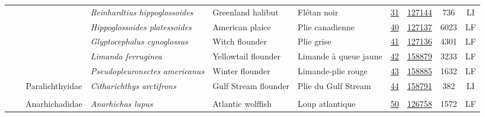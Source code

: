 \documentclass[12pt]{article}\usepackage[]{graphicx}\usepackage[]{color}
\begin{document}
\begin{landscape}
\begin{longtable}[t]{ccc>{\centering\arraybackslash}p{3cm}>{\centering\arraybackslash}p{3cm}>{\centering\arraybackslash}p{3cm}>{}c>{}ccc}
\nopagebreak
\hspace{1em}\hspace{1em} &  &  & \em{Reinhardtius hippoglossoides} & Greenland halibut & Flétan noir & \href{#sec:31}{31} & \href{http://www.marinespecies.org/aphia.php?p=taxdetails&id=127144}{127144} & 736 & LI\\
\nopagebreak
\hspace{1em}\hspace{1em} &  &  & \em{Hippoglossoides platessoides} & American plaice & Plie canadienne & \href{#sec:40}{40} & \href{http://www.marinespecies.org/aphia.php?p=taxdetails&id=127137}{127137} & 6023 & LF\\
\nopagebreak
\hspace{1em}\hspace{1em} &  &  & \em{Glyptocephalus cynoglossus} & Witch flounder & Plie grise & \href{#sec:41}{41} & \href{http://www.marinespecies.org/aphia.php?p=taxdetails&id=127136}{127136} & 4301 & LF\\
\nopagebreak
\hspace{1em}\hspace{1em} &  &  & \em{Limanda ferruginea} & Yellowtail flounder & Limande à queue jaune & \href{#sec:42}{42} & \href{http://www.marinespecies.org/aphia.php?p=taxdetails&id=158879}{158879} & 3233 & LF\\
\nopagebreak
\hspace{1em}\hspace{1em} &  &  & \em{Pseudopleuronectes americanus} & Winter flounder & Limande-plie rouge & \href{#sec:43}{43} & \href{http://www.marinespecies.org/aphia.php?p=taxdetails&id=158885}{158885} & 1632 & LF\\
\nopagebreak
\hspace{1em}\hspace{1em} &  & Paralichthyidae & \em{Citharichthys arctifrons} & Gulf Stream flounder & Plie du Gulf Stream & \href{#sec:44}{44} & \href{http://www.marinespecies.org/aphia.php?p=taxdetails&id=158791}{158791} & 382 & LI\\
\nopagebreak
\addlinespace[0.3em]
\\
\hspace{1em}\hspace{1em} &  & Anarhichadidae & \em{Anarhichas lupus} & Atlantic wolffish & Loup atlantique & \href{#sec:50}{50} & \href{http://www.marinespecies.org/aphia.php?p=taxdetails&id=126758}{126758} & 1572 & LF\\

\end{longtable}
\end{landscape}
\end{document}
